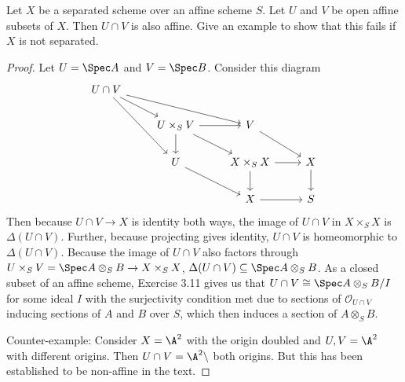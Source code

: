 \begin{exercise}%
	Let $X$ be a separated scheme over an affine scheme $S$. Let $U$ and $V$ be open affine subsets of $X$. Then $U \cap V$ is also affine. Give an example to show that this fails if $X$ is not separated. 
\end{exercise}
\begin{proof}
	Let $U = \Spec A $ and $V = \Spec B $.
	Consider this diagram
	\[\begin{tikzcd}
		{U\cap V} \\
	& {U\times_S V} & V \\
	& U & {X\times _S X} & X \\
	&& X & S
	\arrow[from=1-1, to=2-2]
	\arrow[from=1-1, to=2-3]
	\arrow[from=1-1, to=3-2]
	\arrow[from=2-2, to=2-3]
	\arrow[from=2-2, to=3-2]
	\arrow[from=2-2, to=3-3]
	\arrow[from=2-3, to=3-4]
	\arrow[from=3-2, to=4-3]
	\arrow[from=3-3, to=3-4]
	\arrow[from=3-3, to=4-3]
	\arrow[from=3-4, to=4-4]
	\arrow[from=4-3, to=4-4]
	\end{tikzcd}\]
	Then because $U\cap V\to X $ is identity both ways, the image of $U\cap V $ in $X\times _S X $ is $\Delta(U \cap V) $.
	Further, because projecting gives identity, $U\cap V $ is homeomorphic to $\Delta(U\cap V) $.
	Because the image of $U\cap V $ also factors through $U\times _S V = \Spec A \otimes_S B \to X\times _S X$, $\Delta(U\cap V) \subseteq \Spec A \otimes _S B $.
	As a closed subset of an affine scheme, Exercise 3.11 gives us that $U\cap V \cong \Spec A \otimes _S B / I $ for some ideal $I $ with the surjectivity condition met due to sections of $\mathcal{O}_{U\cap V} $ inducing sections of $A $ and $B $ over $S $, which then induces a section of $A \otimes_S B $.

	Counter-example: Consider $X =\A^2 $ with the origin doubled and $U,V = \A^2$ with different origins.
	Then $U\cap V = \A^2 \setminus $ both origins.
	But this has been established to be non-affine in the text.
\end{proof}

